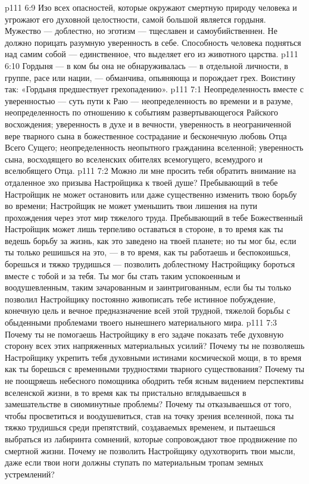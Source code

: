 \vs p111 6:9 \pc Изо всех опасностей, которые окружают смертную природу человека и угрожают его духовной целостности, самой большой является гордыня. Мужество --- доблестно, но эготизм --- тщеславен и самоубийственнен. Не должно порицать разумную уверенность в себе. Способность человека подняться над самим собой --- единственное, что выделяет его из животного царства.
\vs p111 6:10 \pc Гордыня --- в ком бы она не обнаруживалась --- в отдельной личности, в группе, расе или нации, --- обманчива, опьяняюща и порождает грех. Воистину так: «Гордыня предшествует грехопадению».
\vs p111 7:1 Неопределенность вместе с уверенностью --- суть пути к Раю --- неопределенность во времени и в разуме, неопределенность по отношению к событиям развертывающегося Райского восхождения; уверенность в духе и в вечности, уверенность в неограниченной вере тварного сына в божественное сострадание и бесконечную любовь Отца Всего Сущего; неопределенность неопытного гражданина вселенной; уверенность сына, восходящего во вселенских обителях всемогущего, всемудрого и вселюбящего Отца.
\vs p111 7:2 \pc Можно ли мне просить тебя обратить внимание на отдаленное эхо призыва Настройщика к твоей душе? Пребывающий в тебе Настройщик не может остановить или даже существенно изменить твою борьбу во времени; Настройщик не может уменьшить твои лишения на пути прохождения через этот мир тяжелого труда. Пребывающий в тебе Божественный Настройщик может лишь терпеливо оставаться в стороне, в то время как ты ведешь борьбу за жизнь, как это заведено на твоей планете; но ты мог бы, если ты только решишься на это, --- в то время, как ты работаешь и беспокоишься, борешься и тяжко трудишься --- позволить доблестному Настройщику бороться вместе с тобой и за тебя. Ты мог бы стать таким успокоенным и воодушевленным, таким зачарованным и заинтригованным, если бы ты только позволил Настройщику постоянно живописать тебе истинное побуждение, конечную цель и вечное предназначение всей этой трудной, тяжелой борьбы с обыденными проблемами твоего нынешнего материального мира.
\vs p111 7:3 Почему ты не помогаешь Настройщику в его задаче показать тебе духовную сторону всех этих напряженных материальных усилий? Почему ты не позволяешь Настройщику укрепить тебя духовными истинами космической мощи, в то время как ты борешься с временными трудностями тварного существования? Почему ты не поощряешь небесного помощника ободрить тебя ясным видением перспективы вселенской жизни, в то время как ты пристально вглядываешься в замешательстве в сиюминутные проблемы? Почему ты отказываешься от того, чтобы просветиться и воодушевиться, став на точку зрения вселенной, пока ты тяжко трудишься среди препятствий, создаваемых временем, и пытаешься выбраться из лабиринта сомнений, которые сопровождают твое продвижение по смертной жизни. Почему не позволить Настройщику одухотворить твои мысли, даже если твои ноги должны ступать по материальным тропам земных устремлений?
